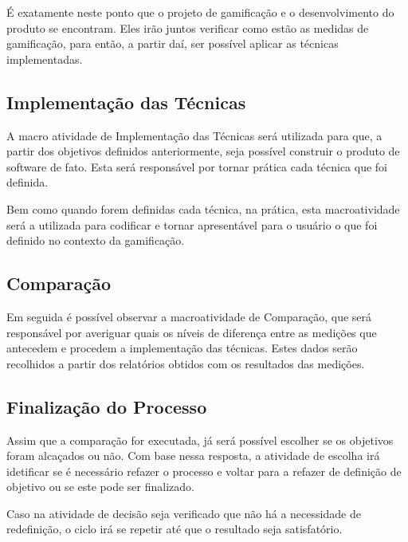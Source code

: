 É exatamente neste ponto que o projeto de gamificação e o desenvolvimento do produto
se encontram. Eles irão juntos verificar como estão as medidas de gamificação, para
então, a partir daí, ser possível aplicar as técnicas implementadas.

\subsection{Implementação das Técnicas}
\label{sub:implematationtechnics}
A macro atividade de Implementação das Técnicas será utilizada para que, a partir
dos objetivos definidos anteriormente, seja possível construir o produto de software
de fato. Esta será responsável por tornar prática
cada técnica que foi definida.

Bem como quando forem definidas cada técnica, na prática, esta macroatividade
será a utilizada para codificar e tornar apresentável para o usuário o que
foi definido no contexto da gamificação.

\subsection{Comparação}
\label{sub:Comparacao}
Em seguida é possível observar a macroatividade de Comparação, que será
responsável por averiguar quais os níveis de diferença entre as medições que
antecedem e procedem a implementação das técnicas. Estes dados serão recolhidos a
partir dos relatórios obtidos com os resultados das medições.

\subsection{Finalização do Processo}
\label{sub:finalprocess}
Assim que a comparação for executada, já será possível escolher se os objetivos
foram alcaçados ou não. Com base nessa resposta, a atividade de escolha irá
idetificar se é necessário refazer o processo e voltar para a refazer de definição
de objetivo ou se este pode ser finalizado.

Caso na atividade de decisão seja verificado que não há a necessidade de
redefinição, o ciclo irá se repetir até que o resultado seja satisfatório.

